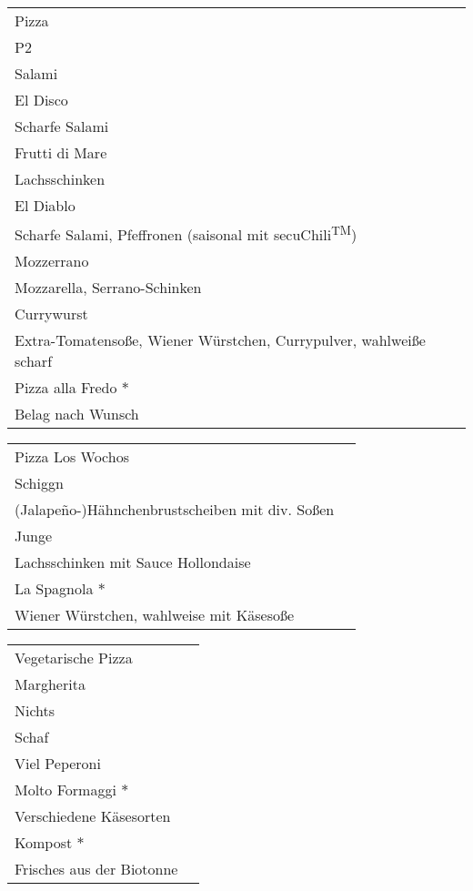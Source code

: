 \documentclass[12pt]{article}
\makeatletter
\newcommand*\ColText[1]{\textcolor{Goldenrod3}{#1}}
\newenvironment{Group}[1]
  {\noindent\begin{tabular*}{\textwidth}{@{}p{\linewidth}@{\extracolsep{\fill}}r@{}}
    {\fontsize{24}{29}\selectfont\ColText{#1}}\\[0.8em]}
  {\end{tabular*}}
\newcommand*\Entry[2]{%
  \sffamily#1 & #2}
\newcommand*\Expl[1]{%
  \hspace*{1em}\footnotesize #1}
\makeatother
\begin{document}
\vspace{1em}

\begin{Group}{Pizza}
\Entry{P2}{} \\
\Expl{Salami} \\
\Entry{El Disco}{} \\
\Expl{Scharfe Salami} \\
\Entry{Frutti di Mare}{} \\
\Expl{Lachsschinken} \\
\Entry{El Diablo}{} \\
\Expl{Scharfe Salami, Pfeffronen (saisonal mit secuChili\textsuperscript{TM})} \\
\Entry{Mozzerrano}{} \\
\Expl{Mozzarella, Serrano-Schinken} \\
\Entry{Currywurst} \\
\Expl{Extra-Tomatensoße, Wiener Würstchen, Currypulver, wahlweiße scharf} \\
\Entry{Pizza alla Fredo $\ast$}{} \\
\Expl{Belag nach Wunsch} \\
\end{Group}

\vspace{1em}

\begin{Group}{Pizza Los Wochos}
\Entry{Schiggn}{} \\
\Expl{(Jalape\~{n}o-)Hähnchenbrustscheiben mit div. Soßen} \\
\Entry{Junge}{} \\
\Expl{Lachsschinken mit Sauce Hollondaise} \\
\Entry{La Spagnola $\ast$}{} \\
\Expl{Wiener Würstchen, wahlweise mit Käsesoße}
\end{Group}

\vspace{1em}

\begin{Group}{Vegetarische Pizza}
\Entry{Margherita}{} \\ 
\Expl{Nichts} \\
\Entry{Schaf}{} \\ 
\Expl{Viel Peperoni} \\
\Entry{Molto Formaggi $\ast$}{} \\ 
\Expl{Verschiedene Käsesorten} \\
\Entry{Kompost $\ast$}{} \\ 
\Expl{Frisches aus der Biotonne} \\
\end{Group}
\end{document}
